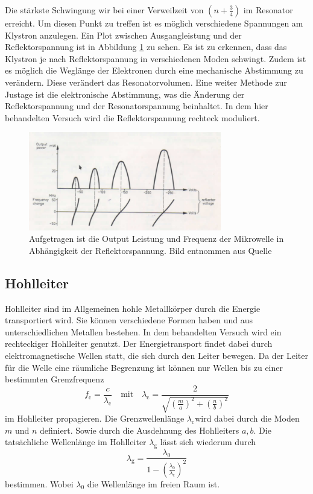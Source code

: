 Die stärkste Schwingung wir bei einer Verweilzeit von $(n + \frac{3}{4})$ im Resonator erreicht.
Um diesen Punkt zu treffen ist es möglich verschiedene Spannungen am Klystron anzulegen.
Ein Plot zwischen Ausgangleistung und der Reflektorspannung ist in Abbildung \ref{fig:output_refelktor_voltage} zu sehen.
Es ist zu erkennen, dass das Klystron je nach Reflektorspannung in verschiedenen Moden schwingt.
Zudem ist es möglich die Weglänge der Elektronen durch eine mechanische Abstimmung zu verändern.
Diese verändert das Resonatorvolumen.
Eine weiter Methode zur Justage ist die elektronische Abstimmung, was die Änderung der Reflektorspannung und der Resonatorspannung beinhaltet.
In dem hier behandelten Versuch wird die Reflektorspannung rechteck moduliert.

\begin{figure}
    \centering
    \includegraphics[width=0.75\textwidth]{content/data/refelx_spannung_schema.png}
    \caption{Aufgetragen ist die Output Leistung und Frequenz der Mikrowelle in Abhängigkeit der Reflektorspannung. Bild entnommen aus Quelle \cite[6]{Anleitung}}
    \label{fig:output_refelktor_voltage}
\end{figure}
\FloatBarrier
\subsection{Hohlleiter}
Hohlleiter sind im Allgemeinen hohle Metallkörper durch die Energie transportiert wird.
Sie können verschiedene Formen haben und aus unterschiedlichen Metallen bestehen.
In dem behandelten Versuch wird ein rechteckiger Hohlleiter genutzt.
Der Energietransport findet dabei durch elektromagnetische Wellen statt, die sich durch den Leiter bewegen.
Da der Leiter für die Welle eine räumliche Begrenzung ist können nur Wellen bis zu einer bestimmten Grenzfrequenz
\begin{equation}
    f_\text{c} = \frac{c}{\lambda _\text{c}} \quad \text{mit} \quad \lambda _\text{c} = \frac{2}{\sqrt{ \left ( \frac{m}{a} \right )^2 + \left ( \frac{n}{b} \right )^2}}
    \label{eq:grenzwellenlaenge}
\end{equation}
im Hohlleiter propagieren.
Die Grenzwellenlänge $\lambda _\text{c} $wird dabei durch die Moden $m$ und $n$ definiert. Sowie durch die Ausdehnung des Hohlleiters $a, b$.
Die tatsächliche Wellenlänge im Hohlleiter $\lambda _\text{g}$ lässt sich wiederum durch 
\begin{equation}
    \lambda _\text{g} = \frac{\lambda _{0}}{1 - \left ( \frac{\lambda _0}{\lambda _\text{c}} \right )^2}
    \label{eq:wellenlaenge_hohleiter}
\end{equation}
bestimmen.
Wobei $\lambda _0$ die Wellenlänge im freien Raum ist.

